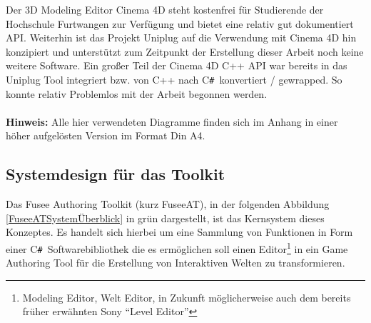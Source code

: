 \documentclass[pagesize, paper=a4, fontsize=12pt, titlepage=true, headings=small, headnosepline, abstractoff, liststotoc, nochapterprefix, plainheadsepline, twoside]{scrreprt}
\newcommand{\CSS}{C\texttt{\# }}
\begin{document}
Der 3D Modeling Editor Cinema 4D steht kostenfrei für Studierende der Hochschule Furtwangen zur Verfügung und bietet eine relativ gut dokumentiert API. Weiterhin ist das Projekt Uniplug auf die Verwendung mit Cinema 4D hin konzipiert und unterstützt zum Zeitpunkt der Erstellung dieser Arbeit noch keine weitere Software. Ein großer Teil der Cinema 4D C++ API war bereits in das Uniplug Tool integriert bzw. von C++ nach \CSS konvertiert / gewrapped. So konnte relativ Problemlos mit der Arbeit begonnen werden.
\\
\\
\textbf{Hinweis:} Alle hier verwendeten Diagramme finden sich im Anhang in einer höher aufgelösten Version im Format Din A4.

\subsection{Systemdesign für das Toolkit}
Das Fusee Authoring Toolkit (kurz FuseeAT), in der folgenden Abbildung \ref{FuseeATSystemÜberblick} in grün dargestellt, ist das Kernsystem dieses Konzeptes. Es handelt sich hierbei um eine Sammlung von Funktionen in Form einer \CSS Softwarebibliothek die es ermöglichen soll einen Editor\footnote{Modeling Editor, Welt Editor, in Zukunft  möglicherweise auch dem bereits früher erwähnten Sony “Level Editor”} in ein Game Authoring Tool für die Erstellung von Interaktiven Welten zu transformieren.
\end{document}

